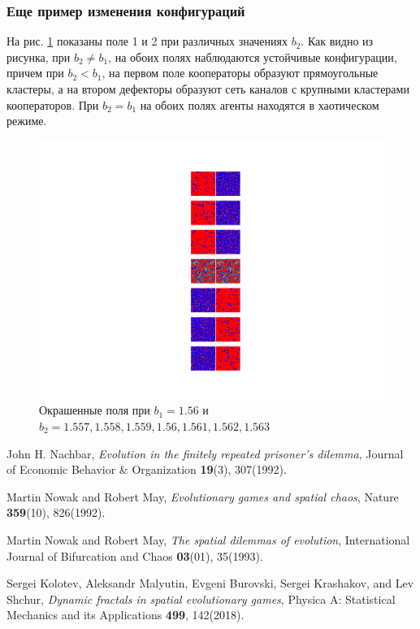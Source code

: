 \documentclass[12pt]{article}
\begin{document}
    \subsubsection{Еще пример изменения конфигураций}
    \label{sec:configs}
    На рис. \ref{fig:fields156} показаны поле 1 и 2 при различных значениях $b_2$. Как видно из рисунка, при $b_2\neq b_1$, на обоих полях наблюдаются устойчивые конфигурации, причем при $b_2<b_1$, на первом поле кооператоры образуют прямоугольные кластеры, а на втором дефекторы образуют сеть каналов с крупными кластерами кооператоров. При $b_2=b_1$ на обоих полях агенты находятся в хаотическом режиме.
    \begin{figure}
         \centering
         \includegraphics[width=0.95\columnwidth, keepaspectratio=True]{DoubleField/colored_2fields156.png}
         \caption{Окрашенные поля при $b_1=1.56$ и $b_2=1.557, 1.558, 1.559, 1.56, 1.561, 1.562, 1.563$}
         \label{fig:fields156}
    \end{figure}

\newpage
\begin{thebibliography}{9}
        John H. Nachbar, \textit{Evolution in the finitely repeated prisoner's dilemma}, Journal of Economic Behavior \& Organization \textbf{19}(3), 307(1992).
    
        Martin Nowak and Robert May, \textit{Evolutionary games and spatial chaos}, Nature \textbf{359}(10), 826(1992).

        Martin Nowak and Robert May, \textit{The spatial dilemmas of evolution}, International Journal of Bifurcation and Chaos \textbf{03}(01), 35(1993).

        Sergei Kolotev, Aleksandr Malyutin, Evgeni Burovski, Sergei Krashakov, and Lev Shchur, \textit{Dynamic fractals in spatial evolutionary games}, Physica   A:   Statistical   Mechanics and its Applications \textbf{499}, 142(2018).
\end{thebibliography}
\end{document}
